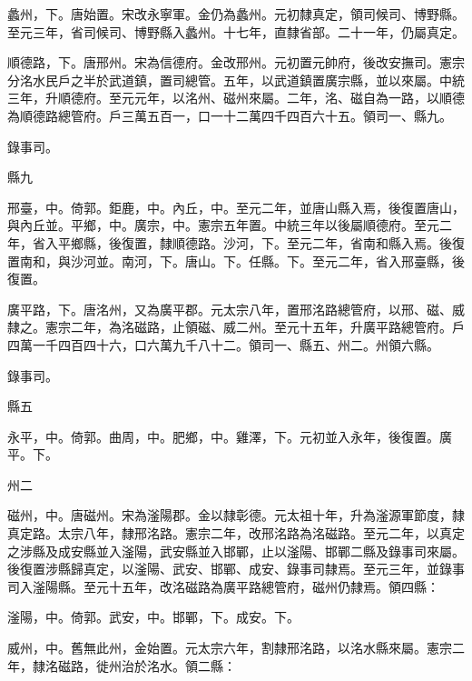 \begin{pinyinscope}
 蠡州，下。唐始置。宋改永寧軍。金仍為蠡州。元初隸真定，領司候司、博野縣。至元三年，省司候司、博野縣入蠡州。十七年，直隸省部。二十一年，仍屬真定。



 順德路，下。唐邢州。宋為信德府。金改邢州。元初置元帥府，後改安撫司。憲宗分洺水民戶之半於武道鎮，置司總管。五年，以武道鎮置廣宗縣，並以來屬。中統三年，升順德府。至元元年，以洺州、磁州來屬。二年，洺、磁自為一路，以順德為順德路總管府。戶三萬五百一，口一十二萬四千四百六十五。領司一、縣九。



 錄事司。



 縣九



 邢臺，中。倚郭。鉅鹿，中。內丘，中。至元二年，並唐山縣入焉，後復置唐山，與內丘並。平鄉，中。廣宗，中。憲宗五年置。中統三年以後屬順德府。至元二年，省入平鄉縣，後復置，隸順德路。沙河，下。至元二年，省南和縣入焉。後復置南和，與沙河並。南河，下。唐山。下。任縣。下。至元二年，省入邢臺縣，後復置。



 廣平路，下。唐洺州，又為廣平郡。元太宗八年，置邢洺路總管府，以邢、磁、威隸之。憲宗二年，為洺磁路，止領磁、威二州。至元十五年，升廣平路總管府。戶四萬一千四百四十六，口六萬九千八十二。領司一、縣五、州二。州領六縣。



 錄事司。



 縣五



 永平，中。倚郭。曲周，中。肥鄉，中。雞澤，下。元初並入永年，後復置。廣平。下。



 州二



 磁州，中。唐磁州。宋為滏陽郡。金以隸彰德。元太祖十年，升為滏源軍節度，隸真定路。太宗八年，隸邢洺路。憲宗二年，改邢洺路為洺磁路。至元二年，以真定之涉縣及成安縣並入滏陽，武安縣並入邯鄲，止以滏陽、邯鄲二縣及錄事司來屬。後復置涉縣歸真定，以滏陽、武安、邯鄲、成安、錄事司隸焉。至元三年，並錄事司入滏陽縣。至元十五年，改洺磁路為廣平路總管府，磁州仍隸焉。領四縣：



 滏陽，中。倚郭。武安，中。邯鄲，下。成安。下。



 威州，中。舊無此州，金始置。元太宗六年，割隸邢洺路，以洺水縣來屬。憲宗二年，隸洺磁路，徙州治於洺水。領二縣：




\end{pinyinscope}
